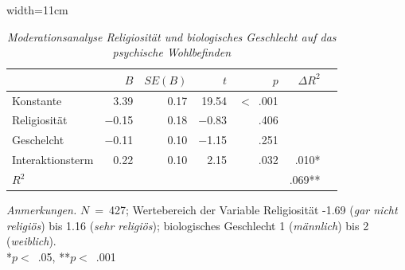 \begin{table}[htb]
  \caption[Moderationsanalyse Religiosität und biologisches Geschlecht auf das psychische Wohlbefinden]{\textit {Moderationsanalyse Religiosität und biologisches Geschlecht auf das psychische Wohlbefinden}} 
  \label{H3_Moderation}
  \centering
  \begin{adjustbox}{width=11cm} %
  \small
  \begin{tabular}{lrrrrrr}
    \hline
               & $B$   & $SE(B)$&  $t$    & $p$   & $\Delta R^{2}$\\
    \hline
  Konstante    & 3.39    & 0.17 & 19.54   & $<$~.001 & \\
  Religiosität & $-$0.15 & 0.18 & $-$0.83 & .406     & \\
  Geschelcht   & $-$0.11 & 0.10 & $-$1.15 & .251     & \\
  Interaktionsterm & 0.22 & 0.10 & 2.15   & .032     & .010* \\
  $R^{2}$          &      &      &        &          & .069** \\
     \hline
  \end{tabular}
  \end{adjustbox}
  
  \begin{tablenotes}
      \item \textit{Anmerkungen.} \(N\)~=~427; Wertebereich der Variable Religiosität -1.69 (\textit{gar nicht religiös}) bis 1.16 (\textit{sehr religiös}); biologisches Geschlecht 1 (\textit{männlich}) bis 2 (\textit{weiblich}).\\ *$p<$~.05, **$p<$~.001
    \end{tablenotes}
  \end{table}


